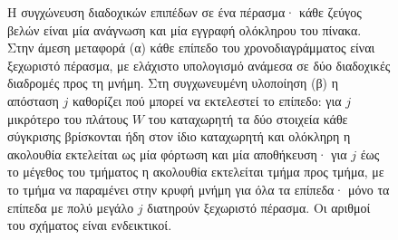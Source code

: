 \begin{figure}[H]
    \caption[Συγχώνευση διαδοχικών επιπέδων σε ένα πέρασμα]{Η συγχώνευση διαδοχικών επιπέδων σε ένα πέρασμα· κάθε ζεύγος βελών
    είναι μία ανάγνωση και μία εγγραφή ολόκληρου του πίνακα. Στην άμεση μεταφορά
    (α) κάθε επίπεδο του χρονοδιαγράμματος είναι ξεχωριστό πέρασμα, με ελάχιστο
    υπολογισμό ανάμεσα σε δύο διαδοχικές διαδρομές προς τη μνήμη. Στη συγχωνευμένη
    υλοποίηση (β) η απόσταση $j$ καθορίζει πού μπορεί να εκτελεστεί το επίπεδο: για
    $j$ μικρότερο του πλάτους $W$ του καταχωρητή τα δύο στοιχεία κάθε σύγκρισης
    βρίσκονται ήδη στον ίδιο καταχωρητή και ολόκληρη η ακολουθία εκτελείται ως μία
    φόρτωση και μία αποθήκευση· για $j$ έως το μέγεθος του τμήματος η ακολουθία
    εκτελείται τμήμα προς τμήμα, με το τμήμα να παραμένει στην κρυφή μνήμη για όλα
    τα επίπεδα· μόνο τα επίπεδα με πολύ μεγάλο $j$ διατηρούν ξεχωριστό πέρασμα. Οι
    αριθμοί του σχήματος είναι ενδεικτικοί.}
    \label{fig:cpu-layer-fusion}
\end{figure}

